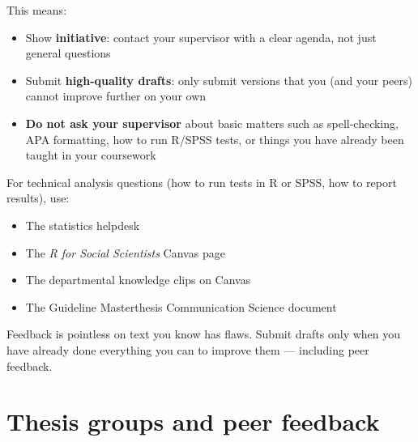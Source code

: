 \documentclass[
  11pt,
  a4paper,
]{scrbook}
\providecommand{\tightlist}{%
  \setlength{\itemsep}{0pt}\setlength{\parskip}{0pt}}\usepackage{longtable,booktabs,array}
\begin{document}
This means:

\begin{itemize}
\tightlist
\item
  Show \textbf{initiative}: contact your supervisor with a clear agenda,
  not just general questions
\item
  Submit \textbf{high-quality drafts}: only submit versions that you
  (and your peers) cannot improve further on your own
\item
  \textbf{Do not ask your supervisor} about basic matters such as
  spell-checking, APA formatting, how to run R/SPSS tests, or things you
  have already been taught in your coursework
\end{itemize}

For technical analysis questions (how to run tests in R or SPSS, how to
report results), use:

\begin{itemize}
\tightlist
\item
  The statistics helpdesk
\item
  The \emph{R for Social Scientists} Canvas page
\item
  The departmental knowledge clips on Canvas
\item
  The Guideline Masterthesis Communication Science document
\end{itemize}

\begin{tcolorbox}[enhanced jigsaw, bottomrule=.15mm, opacityback=0, toprule=.15mm, colframe=quarto-callout-warning-color-frame, left=2mm, rightrule=.15mm, title=\textcolor{quarto-callout-warning-color}{\faExclamationTriangle}\hspace{0.5em}{Feedback is only useful if you've done your part}, colbacktitle=quarto-callout-warning-color!10!white, bottomtitle=1mm, colback=white, breakable, toptitle=1mm, titlerule=0mm, leftrule=.75mm, arc=.35mm, opacitybacktitle=0.6, coltitle=black]

Feedback is pointless on text you know has flaws. Submit drafts only
when you have already done everything you can to improve them ---
including peer feedback.

\end{tcolorbox}

\section{Thesis groups and peer
feedback}\label{thesis-groups-and-peer-feedback}
\end{document}
